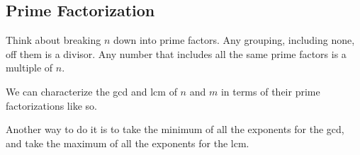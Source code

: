 \documentclass[../main.tex]{subfiles}
\begin{document}
\subsection{Prime Factorization}

Think about breaking \( n \) down into prime factors.
Any grouping, including none, off them is a divisor.
Any number that includes all the same prime factors is a multiple of \( n \).

\noindent


We can characterize the gcd and lcm of \( n \) and \( m \)
in terms of their prime factorizations like so.

\noindent


Another way to do it is to take the minimum of all the exponents for the gcd,
and take the maximum of all the exponents for the lcm.
\end{document}
